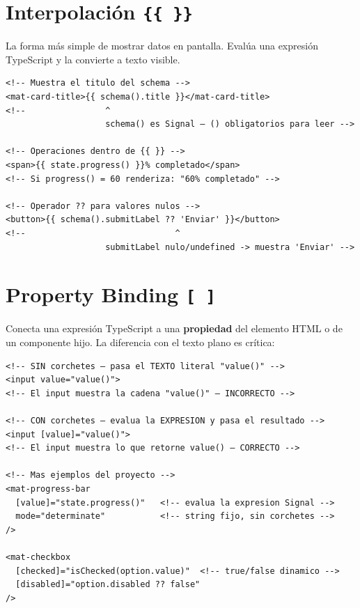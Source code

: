 \documentclass[12pt, a4paper]{article}
\begin{document}
\section{ Interpolación \texttt{\{\{ \}\}}}

La forma más simple de mostrar datos en pantalla.
Evalúa una expresión TypeScript y la convierte a texto visible.

\begin{lstlisting}
<!-- Muestra el titulo del schema -->
<mat-card-title>{{ schema().title }}</mat-card-title>
<!--                ^
                    schema() es Signal — () obligatorios para leer -->

<!-- Operaciones dentro de {{ }} -->
<span>{{ state.progress() }}% completado</span>
<!-- Si progress() = 60 renderiza: "60% completado" -->

<!-- Operador ?? para valores nulos -->
<button>{{ schema().submitLabel ?? 'Enviar' }}</button>
<!--                              ^
                    submitLabel nulo/undefined -> muestra 'Enviar' -->
\end{lstlisting}

\section{ Property Binding \texttt{[ ]}}

Conecta una expresión TypeScript a una \textbf{propiedad} del elemento HTML
o de un componente hijo. La diferencia con el texto plano es crítica:

\begin{lstlisting}
<!-- SIN corchetes — pasa el TEXTO literal "value()" -->
<input value="value()">
<!-- El input muestra la cadena "value()" — INCORRECTO -->

<!-- CON corchetes — evalua la EXPRESION y pasa el resultado -->
<input [value]="value()">
<!-- El input muestra lo que retorne value() — CORRECTO -->

<!-- Mas ejemplos del proyecto -->
<mat-progress-bar
  [value]="state.progress()"   <!-- evalua la expresion Signal -->
  mode="determinate"           <!-- string fijo, sin corchetes -->
/>

<mat-checkbox
  [checked]="isChecked(option.value)"  <!-- true/false dinamico -->
  [disabled]="option.disabled ?? false"
/>
\end{lstlisting}
\end{document}
